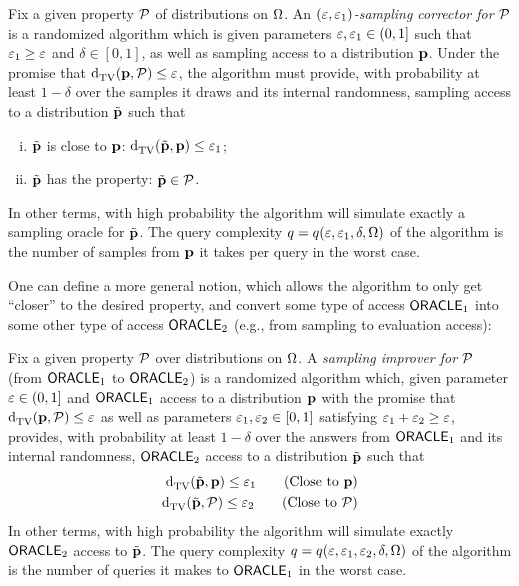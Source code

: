 \begin{definition}\label{def:sampling:corrector}
  Fix a given property $\mathcal{P}$ of distributions on ${\Omega}$. 
An \emph{$(\varepsilon,\varepsilon_1)$-sampling corrector for $\mathcal{P}$} is a randomized algorithm which is given parameters $\varepsilon, \varepsilon_1\in(0,1]$ such that $\varepsilon_1 \geq \varepsilon$ and $\delta\in[0,1]$, as well as sampling access to a distribution $\mathbf{p}$. Under the promise that ${\operatorname{d}_{\rm{TV}}^{}\!\left({\mathbf{p}, \mathcal{P}}\right)}\leq \varepsilon$, the algorithm must provide, with probability at least $1-\delta$ over the samples it draws and its internal randomness, sampling access to a distribution $\tilde{\mathbf{p}}$ such that
  \begin{enumerate}[(i)]
    \item $\tilde{\mathbf{p}}$ is close to $\mathbf{p}$: ${\operatorname{d}_{\rm{TV}}^{}\!\left({\tilde{\mathbf{p}}, \mathbf{p}}\right)} \leq \varepsilon_1$;
    \item $\tilde{\mathbf{p}}$ has the property: $\tilde{\mathbf{p}}\in \mathcal{P}$.
  \end{enumerate}
  In other terms, with high probability the {algorithm}   will simulate exactly a sampling oracle for $\tilde{\mathbf{p}}$. The query complexity $q=q(\varepsilon,\varepsilon_1,\delta,{\Omega})$ of the algorithm is the number of samples from $\mathbf{p}$ it takes per query in the worst case.
\end{definition}

One can define a more general notion, which allows the algorithm to only get ``closer'' to the desired property, and convert some type of access ${\sf ORACLE}_1$ into some other type of access ${\sf ORACLE}_2$ (e.g., from sampling to evaluation access):
\begin{definition}\label{def:sampling:corrector:general}
  Fix a given property $\mathcal{P}$ over distributions on ${\Omega}$. A \emph{sampling improver for $\mathcal{P}$} (from ${\sf ORACLE}_1$ to ${\sf ORACLE}_2$) is a randomized algorithm which, given parameter $\varepsilon\in(0,1]$ and ${\sf ORACLE}_1$ access to a distribution $\mathbf{p}$ with the promise that ${\operatorname{d}_{\rm{TV}}^{}\!\left({\mathbf{p}, \mathcal{P}}\right)}\leq \varepsilon$ as well as parameters $\varepsilon_1,\varepsilon_2\in[0,1]$ satisfying $\varepsilon_1+\varepsilon_2\geq \varepsilon$, provides, with probability at least $1-\delta$ over the answers from ${\sf ORACLE}_1$ and its internal randomness, ${\sf ORACLE}_2$ access to a distribution $\tilde{\mathbf{p}}$ such that
  \begin{align*}
    \totalvardist{\tilde{\D}}{\D} \leq \eps_1 \tag{Close to $\D$}\\
    \totalvardist{\tilde{\D}}{\property} \leq \eps_2 \tag{Close to \property}
  \end{align*}
  In other terms, with high probability the algorithm
   will simulate exactly ${\sf ORACLE}_2$ access to $\tilde{\mathbf{p}}$. The query complexity $q=q(\varepsilon,\varepsilon_1,\varepsilon_2,\delta,{\Omega})$ of the algorithm is the number of queries it makes to ${\sf ORACLE}_1$ in the worst case.
\end{definition}

